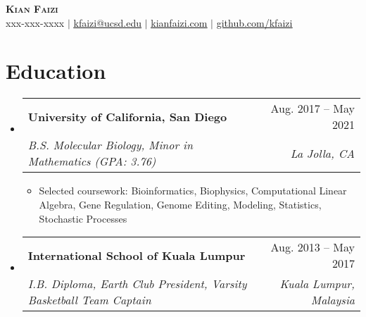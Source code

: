 \documentclass[letterpaper,11pt]{article}
\makeatletter
\newcommand{\resumeItem}[1]{
  \item\small{
    {#1 \vspace{-2pt}}
  }
}
\newcommand{\resumeSubheading}[4]{
  \vspace{-2pt}\item
    \begin{tabular*}{0.97\textwidth}[t]{l@{\extracolsep{\fill}}r}
      \textbf{#1} & #2 \\
      \textit{\small#3} & \textit{\small #4} \\
    \end{tabular*}\vspace{-7pt}
}
\newcommand{\resumeSubHeadingListStart}{\begin{itemize}[leftmargin=0.15in, label={}]}
\newcommand{\resumeSubHeadingListEnd}{\end{itemize}}
\newcommand{\resumeItemListStart}{\begin{itemize}}
\newcommand{\resumeItemListEnd}{\end{itemize}\vspace{-5pt}}
\makeatother
\begin{document}

\begin{center}
    \textbf{\Huge \scshape Kian Faizi} \\ \vspace{1pt}
    \small xxx-xxx-xxxx $|$ \href{mailto:kfaizi@ucsd.edu}{\ul{kfaizi@ucsd.edu}} $|$ 
    \href{https://www.kianfaizi.com/}{\ul{kianfaizi.com}} $|$
    \href{https://www.github.com/kfaizi/}{\ul{github.com/kfaizi}}
\end{center}


\section{Education}
  \resumeSubHeadingListStart
    \resumeSubheading
      {University of California, San Diego}{Aug. 2017 -- May 2021}
      {B.S. Molecular Biology, Minor in Mathematics (GPA: 3.76)}{La Jolla, CA}
      \resumeItemListStart
        \resumeItem{Selected coursework: Bioinformatics, Biophysics, Computational Linear Algebra, Gene Regulation, Genome Editing, Modeling, Statistics, Stochastic Processes}
      \resumeItemListEnd
    \resumeSubheading
      {International School of Kuala Lumpur}{Aug. 2013 -- May 2017}
      {I.B. Diploma, Earth Club President, Varsity Basketball Team Captain}{Kuala Lumpur, Malaysia}
  \resumeSubHeadingListEnd


\end{document}
